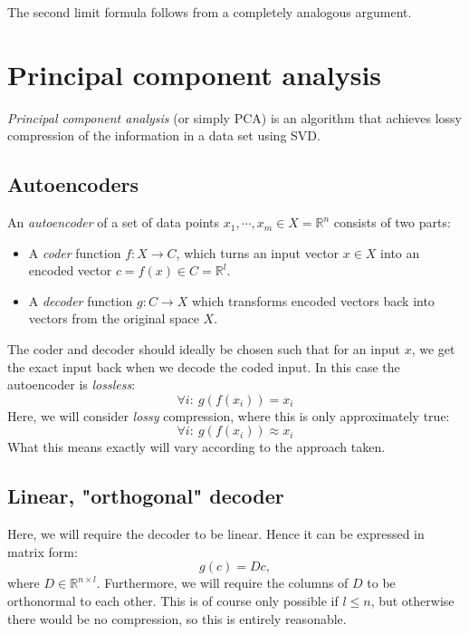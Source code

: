 \documentclass[12pt, a4paper]{article}
\numberwithin{equation}{section}
\begin{document}
The second limit formula follows from a completely analogous argument.

\section{Principal component analysis}
\textit{Principal component analysis} (or simply PCA) is an algorithm that achieves lossy compression of the information in a data set using SVD.

\subsection{Autoencoders}
An \textit{autoencoder} of a set of data points $x_1,\cdots, x_m\in X=\mathbb{R}^n$ consists of two parts:
\begin{itemize}
\item A \textit{coder} function $f: X\rightarrow C$, which turns an input vector $x\in X$ into an encoded vector $c=f(x)\in C=\mathbb{R}^l$.
\item A \textit{decoder} function $g: C\rightarrow X$ which transforms encoded vectors back into vectors from the original space $X$.
\end{itemize}
The coder and decoder should ideally be chosen such that for an input $x$, we get the exact input back when we decode the coded input. In this case the autoencoder is \textit{lossless}:
\begin{equation}
\forall i:\ g(f(x_i))=x_i
\end{equation}
Here, we will consider \textit{lossy} compression, where this is only approximately true:
\begin{equation}
\forall i:\ g(f(x_i))\approx x_i
\end{equation} 
What this means exactly will vary according to the approach taken.

\subsection{Linear, "orthogonal" decoder}
Here, we will require the decoder to be linear. Hence it can be expressed in matrix form:
\begin{equation}
g(c)=Dc,
\end{equation}
where $D\in\mathbb{R}^{n\times l}$. Furthermore, we will require the columns of $D$ to be orthonormal to each other. This is of course only possible if $l\le n$, but otherwise there would be no compression, so this is entirely reasonable.
\end{document}
